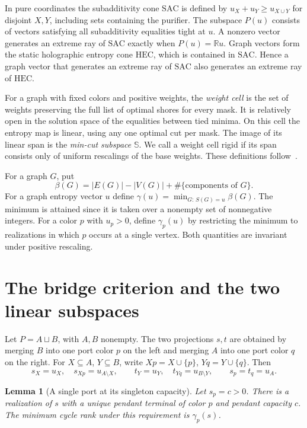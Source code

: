 \documentclass[11pt]{article}
\newtheorem{lemma}[theorem]{Lemma}
\newcommand{\SAC}{\mathrm{SAC}}
\newcommand{\HEC}{\mathrm{HEC}}
\newcommand{\MC}{\mathbb{S}}
\begin{document}
In pure coordinates the subadditivity cone \(\SAC\) is defined by
\(u_X+u_Y\geq u_{X\cup Y}\) for disjoint \(X,Y\), including sets containing
the purifier. The subspace \(P(u)\) consists of vectors satisfying all
subadditivity equalities tight at \(u\). A nonzero vector generates an
extreme ray of \(\SAC\) exactly when \(P(u)=\mathbb Ru\). Graph vectors
form the static holographic entropy cone \(\HEC\), which is contained in
\(\SAC\). Hence a graph vector that generates an extreme ray of \(\SAC\)
also generates an extreme ray of \(\HEC\).

For a graph with fixed colors and positive weights, the \emph{weight cell}
is the set of weights preserving the full list of optimal shores for
every mask. It is relatively open in the solution space of the equalities
between tied minima. On this cell the entropy map is linear, using any
one optimal cut per mask. The image of its linear span is the
\emph{min-cut subspace} \(\MC\). We call a weight cell rigid if its span
consists only of uniform rescalings of the base weights. These definitions
follow~\cite{hhr2022}.

For a graph \(G\), put
\[
 \beta(G)=|E(G)|-|V(G)|+\#\{\text{components of }G\}.
\]
For a graph entropy vector \(u\) define
\(\gamma(u)=\min_{G:\,S(G)=u}\beta(G)\). The minimum is attained since it
is taken over a nonempty set of nonnegative integers. For a color \(p\)
with \(u_p>0\), define \(\gamma_p(u)\) by restricting the minimum to
realizations in which \(p\) occurs at a single vertex. Both quantities
are invariant under positive rescaling.

\section{The bridge criterion and the two linear subspaces}
\label{sec:bridge}

Let \(P=A\sqcup B\), with \(A,B\) nonempty. The two projections \(s,t\)
are obtained by merging \(B\) into one port color \(p\) on the left and
merging \(A\) into one port color \(q\) on the right. For \(X\subseteq A\),
\(Y\subseteq B\), write \(Xp=X\cup\{p\}\), \(Yq=Y\cup\{q\}\). Then
\[
 s_X=u_X,\quad s_{Xp}=u_{A\setminus X},\qquad
 t_Y=u_Y,\quad t_{Yq}=u_{B\setminus Y},\qquad
 s_p=t_q=u_A.
\]

\begin{lemma}[A single port at its singleton capacity]
\label{lem:port}
Let \(s_p=c>0\). There is a realization of \(s\) with a unique pendant
terminal of color \(p\) and pendant capacity \(c\). The minimum cycle
rank under this requirement is \(\gamma_p(s)\).
\end{lemma}
\end{document}

